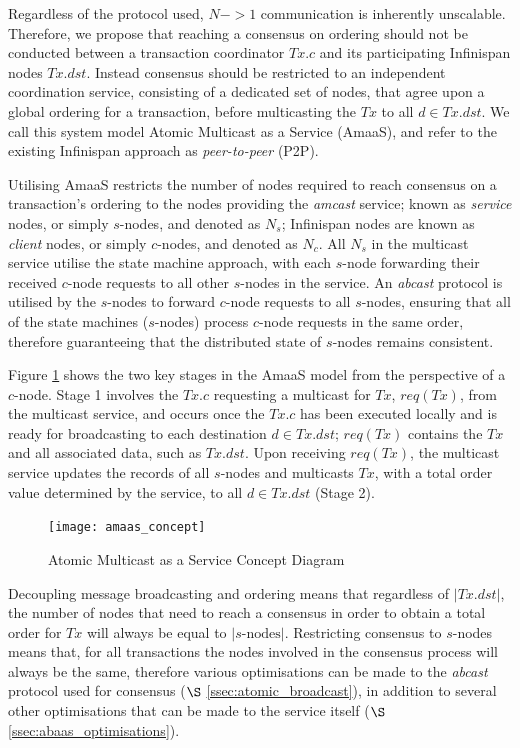 Regardless of the protocol used, $N->1$ communication is inherently unscalable.  Therefore, we propose that reaching a consensus on ordering should not be conducted between a transaction coordinator $Tx.c$ and its participating Infinispan nodes $Tx.dst$.  Instead consensus should be restricted to an independent coordination service, consisting of a dedicated set of nodes, that agree upon a global ordering for a transaction, before multicasting the $Tx$ to all $d \in Tx.dst$.  We call this system model Atomic Multicast as a Service (\textsf{AmaaS}), and refer to the existing Infinispan approach as \emph{peer-to-peer} (P2P).  

Utilising \textsf{AmaaS} restricts the number of nodes required to reach consensus on a transaction's ordering to the nodes providing the \emph{amcast} service; known as \emph{service} nodes, or simply $s$-nodes, and denoted as $N_s$; Infinispan nodes are known as \emph{client} nodes, or simply $c$-nodes, and denoted as $N_c$.  All $N_s$ in the multicast service utilise the state machine approach, with each $s$-node forwarding their received $c$-node requests to all other $s$-nodes in the service.  An \emph{abcast} protocol is utilised by the $s$-nodes to forward $c$-node requests to all $s$-nodes, ensuring that all of the state machines ($s$-nodes) process $c$-node requests in the same order, therefore guaranteeing that the distributed state of $s$-nodes remains consistent.  

Figure \ref{fig:abaas_concept} shows the two key stages in the \textsf{AmaaS} model from the perspective of a $c$-node.  Stage 1 involves the $Tx.c$ requesting a multicast for $Tx$, $req(Tx)$,  from the multicast service, and occurs once the $Tx.c$ has been executed locally and is ready for broadcasting to each destination $d \in Tx.dst$; $req(Tx)$ contains the $Tx$ and all associated data, such as $Tx.dst$.  Upon receiving $req(Tx)$, the multicast service updates the records of all $s$-nodes and multicasts $Tx$, with a total order value determined by the service, to all $d \in Tx.dst$ (Stage 2).  

    \begin{figure}[htbp!] 
        \centering    
         \texttt{[image: amaas\_concept]}
         \caption[Atomic Multicast as a Service Concept Diagram]{Atomic Multicast as a Service Concept Diagram}
         \label{fig:abaas_concept}
    \end{figure}	 

Decoupling message broadcasting and ordering means that regardless of $\left\vert Tx.dst \right\vert$, the number of nodes that need to reach a consensus in order to obtain a total order for $Tx$ will always be equal to $\left\vert s\text{-nodes}\right\vert$.  Restricting consensus to $s$-nodes means that, for all transactions the nodes involved in the consensus process will always be the same, therefore various optimisations can be made to the \emph{abcast} protocol used for consensus ($\S$ \ref{ssec:atomic_broadcast}), in addition to several other optimisations that can be made to the service itself ($\S$ \ref{ssec:abaas_optimisations}).  

